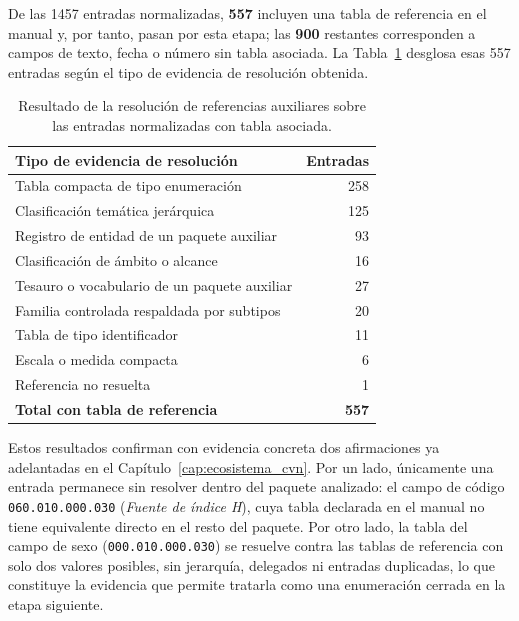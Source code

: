 De las 1457 entradas normalizadas, \textbf{557} incluyen una tabla de
referencia en el manual y, por tanto, pasan por esta etapa; las \textbf{900}
restantes corresponden a campos de texto, fecha o número sin tabla asociada.
La Tabla~\ref{tab:pipeline_resolucion_auxiliar} desglosa esas 557 entradas
según el tipo de evidencia de resolución obtenida.

\begin{table}[htbp]
  \centering
  \small
  \renewcommand{\arraystretch}{1.2}
  \begin{tabular}{p{} r}
    \hline
    \textbf{Tipo de evidencia de resolución} & \textbf{Entradas} \\
    \hline
    Tabla compacta de tipo enumeración & 258 \\
    Clasificación temática jerárquica & 125 \\
    Registro de entidad de un paquete auxiliar & 93 \\
    Clasificación de ámbito o alcance & 16 \\
    Tesauro o vocabulario de un paquete auxiliar & 27 \\
    Familia controlada respaldada por subtipos & 20 \\
    Tabla de tipo identificador & 11 \\
    Escala o medida compacta & 6 \\
    Referencia no resuelta & 1 \\
    \hline
    \textbf{Total con tabla de referencia} & \textbf{557} \\
    \hline
  \end{tabular}
  \caption{Resultado de la resolución de referencias auxiliares sobre las entradas normalizadas con tabla asociada.}
  \label{tab:pipeline_resolucion_auxiliar}
\end{table}

Estos resultados confirman con evidencia concreta dos afirmaciones ya
adelantadas en el Capítulo~\ref{cap:ecosistema_cvn}. Por un lado, únicamente
una entrada permanece sin resolver dentro del paquete analizado: el campo de
código \texttt{060.010.000.030} (\emph{Fuente de índice H}), cuya tabla
declarada en el manual no tiene equivalente directo en el resto del paquete.
Por otro lado, la tabla del campo de sexo (\texttt{000.010.000.030}) se
resuelve contra las tablas de referencia con solo dos valores posibles, sin
jerarquía, delegados ni entradas duplicadas, lo que constituye la evidencia
que permite tratarla como una enumeración cerrada en la etapa siguiente.

